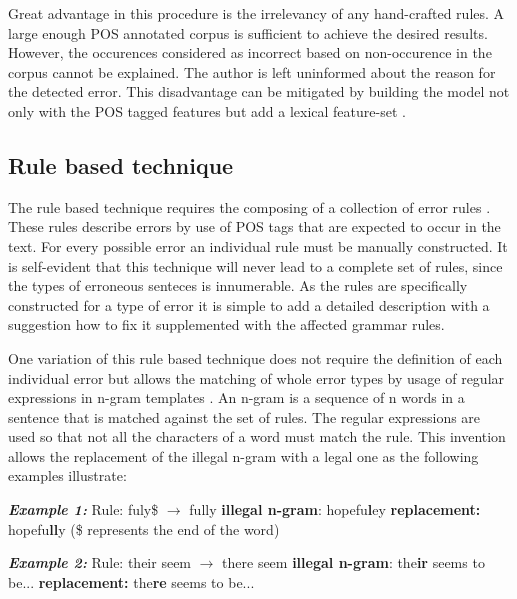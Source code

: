 \documentclass[runningheads]{llncs}
\begin{document}
Great advantage in this procedure is the irrelevancy of any hand-crafted rules. A large enough POS annotated corpus is sufficient to achieve the desired results. However, the occurences considered as incorrect based on non-occurence in the corpus cannot be explained. The author is left uninformed about the reason for the detected error. This disadvantage can be mitigated by building the model not only with the POS tagged features but add a lexical feature-set \citep{gamon_using_2009}.

\subsection{Rule based technique}
The rule based technique requires the composing of a collection of error rules \citep{manchanda_various_2016}. These rules describe errors by use of POS tags that are expected to occur in the text. For every possible error an individual rule must be manually constructed. It is self-evident that this technique will never lead to a complete set of rules, since the types of erroneous senteces is innumerable. As the rules are specifically constructed for a type of error it is simple to add a detailed description with a suggestion how to fix it supplemented with the affected grammar rules.

One variation of this rule based technique does not require the definition of each individual error but allows the matching of whole error types by usage of regular expressions in n-gram templates \citep{kantrowitz_method_2003}. An n-gram is a sequence of n words in a sentence that is matched against the set of rules. The regular expressions are used so that not all the characters of a word must match the rule. This invention allows the replacement of the illegal n-gram with a legal one as the following examples illustrate:

\textbf{\textit{Example 1:}}
\newline Rule: fuly\$ $\rightarrow$ fully
\newline\textbf{illegal n-gram}: hopefu\textbf{l}ey
\newline\textbf{replacement:} hopefu\textbf{ll}y
\newline(\$ represents the end of the word)

\textbf{\textit{Example 2:}}
\newline Rule: their seem $\rightarrow$ there seem
\newline\textbf{illegal n-gram}: the\textbf{ir} seems to be...
\newline\textbf{replacement:} the\textbf{re} seems to be...
\end{document}
